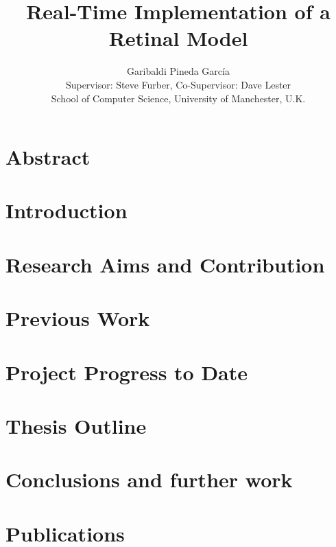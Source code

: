 \documentclass[11pt,a4paper]{article}
\title{\textbf{Real-Time Implementation of a Retinal Model}}
\author{Garibaldi Pineda Garc\'ia\\
        Supervisor: Steve Furber, Co-Supervisor: Dave Lester\\
        School of Computer Science, University of Manchester, U.K.}
\date{}
\begin{document}
\thispagestyle{empty}
%
\maketitle


\section*{Abstract}


\section{Introduction}
\label{sec-intro}


\section{Research Aims and Contribution}
\label{sec-aims-contribs}


\section{Previous Work}
\label{sec-prev-work}


\section{Project Progress to Date}
\label{sec-project-progress}


\section{Thesis Outline}
\label{sec-thesis-toc}


\section{Conclusions and further work}
\label{sec-conclusions}


\section{Publications}
\label{sec-publications}

\end{document}
